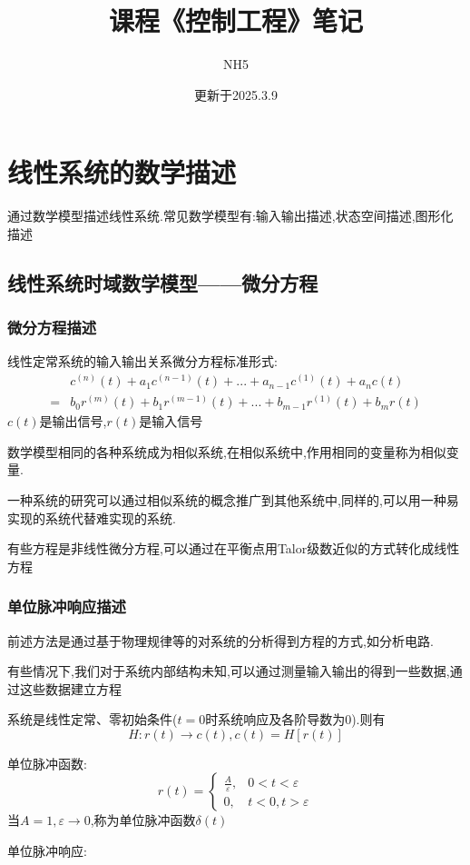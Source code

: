 \documentclass[12pt,a4paper,oneside]{ctexart}
\title{课程《控制工程》笔记}
\author{NH5}
\date{更新于2025.3.9}
\begin{document}
\maketitle
\section{线性系统的数学描述}
通过数学模型描述线性系统.常见数学模型有:输入输出描述,状态空间描述,图形化描述

\subsection{线性系统时域数学模型——微分方程}
\subsubsection{微分方程描述}
线性定常系统的输入输出关系微分方程标准形式:
\begin{align*}
    &c^{(n)}(t) + a_1c^{(n-1)}(t) + ... + a_{n-1}c^{(1)}(t) + a_nc(t)\\
    = &b_0r^{(m)}(t) + b_1r^{(m-1)}(t) + ... + b_{m-1}r^{(1)}(t) + b_mr(t)
\end{align*}
$c(t)$是输出信号,$r(t)$是输入信号

数学模型相同的各种系统成为相似系统,在相似系统中,作用相同的变量称为相似变量.

一种系统的研究可以通过相似系统的概念推广到其他系统中,同样的,可以用一种易实现的系统代替难实现的系统.

有些方程是非线性微分方程,可以通过在平衡点用Talor级数近似的方式转化成线性方程

\subsubsection{单位脉冲响应描述}
前述方法是通过基于物理规律等的对系统的分析得到方程的方式,如分析电路.

有些情况下,我们对于系统内部结构未知,可以通过测量输入输出的得到一些数据,通过这些数据建立方程

系统是线性定常、零初始条件($t=0$时系统响应及各阶导数为$0$).则有
\[
    H:r(t) \to c(t),c(t) = H[r(t)]
\]

单位脉冲函数:
\[
    r(t)=\begin{cases}
        \frac{A}{\varepsilon}, &0<t<\varepsilon \\
        0, & t<0,t>\varepsilon
    \end{cases}
\]
当$A=1,\varepsilon \to 0$,称为单位脉冲函数$\delta(t)$

单位脉冲响应:
\end{document}
